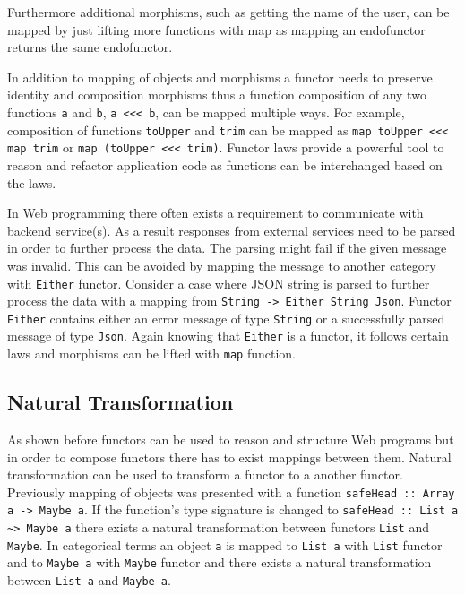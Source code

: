 \documentclass[article]{aaltoseries}
\begin{document}
    Furthermore additional morphisms, such as getting the name of the user, can
    be mapped by just lifting more functions with map as mapping an endofunctor
    returns the same endofunctor.
 
    In addition to mapping of objects and morphisms a functor needs to preserve
    identity and composition morphisms thus a function composition of any two
    functions \lstinline|a| and \lstinline|b|, \lstinline|a <<< b|, can be
    mapped multiple ways. For example, composition of functions
    \lstinline|toUpper| and \lstinline|trim| can be mapped as
    \lstinline|map toUpper <<< map trim| or \lstinline|map (toUpper <<< trim)|.
    Functor laws provide a powerful tool to reason and refactor application code
    as functions can be interchanged based on the laws.

    In Web programming there often exists a requirement to communicate with
    backend service(s). As a result responses from external services need to be
    parsed in order to further process the data. The parsing might fail if the
    given message was invalid. This can be avoided by mapping the message to
    another category with \lstinline|Either| functor. Consider a case where JSON
    string is parsed to further process the data with a mapping from
    \lstinline|String -> Either String Json|. Functor \lstinline|Either|
    contains either an error message of type \lstinline|String| or a
    successfully parsed message of type \lstinline|Json|. Again knowing that
    \lstinline|Either| is a functor, it follows certain laws and morphisms can
    be lifted with \lstinline|map| function.



  \subsection{Natural Transformation}
    As shown before functors can be used to reason and structure Web programs
    but in order to compose functors there has to exist mappings between them.
    Natural transformation can be used to transform a functor to a another
    functor. Previously mapping of objects was presented with a function
    \lstinline|safeHead :: Array a -> Maybe a|. If the function’s type signature
    is changed to \lstinline|safeHead :: List a ~> Maybe a| there exists a
    natural transformation between functors \lstinline|List| and
    \lstinline|Maybe|. In categorical terms an object \lstinline|a| is mapped to
    \lstinline|List a| with \lstinline|List| functor and to \lstinline|Maybe a| with
    \lstinline|Maybe| functor and there exists a natural transformation between
    \lstinline|List a| and \lstinline|Maybe a|.
\end{document}
